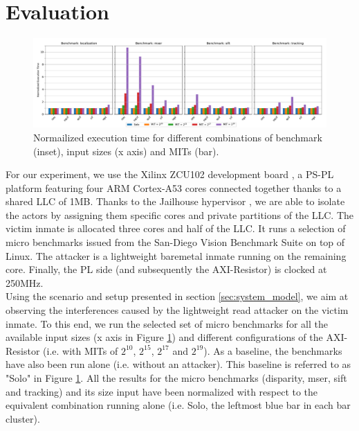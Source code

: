 \section{Evaluation}
    \label{sec:evaluation}
    \begin{figure}
        \centering
        \includegraphics[scale=0.425]{images/cpu-brainfreeze-interference.pdf}
        \caption{Normailized execution time for different combinations of benchmark (inset), input sizes (x axis) and MITs (bar).}
        \label{fig:cpu-brainfreeze-interference-results}
    \end{figure}

    For our experiment, we use the Xilinx ZCU102 development board \cite{Xilinx-ULTRASCALE-TRM}, a PS-PL platform featuring four ARM Cortex-A53 cores \cite{ARM-cortex-A53} connected together thanks to a shared LLC of 1MB.
    Thanks to the Jailhouse hypervisor \cite{jailhouse}, we are able to isolate the actors by assigning them specific cores and private partitions of the LLC.
    The victim inmate is allocated three cores and half of the LLC.
    It runs a selection of micro benchmarks issued from the San-Diego Vision Benchmark Suite \cite{SD-VBS} on top of Linux.
    The attacker is a lightweight baremetal inmate running on the remaining core.
    Finally, the PL side (and subsequently the AXI-Resistor) is clocked at 250MHz.\\

    Using the scenario and setup presented in section \ref{sec:system_model}, we aim at observing the interferences caused by the lightweight read attacker on the victim inmate.
    To this end, we run the selected set of micro benchmarks for all the available input sizes (x axis in Figure \ref{fig:cpu-brainfreeze-interference-results}) and different configurations of the AXI-Resistor (i.e. with MITs of $2^{10}$, $2^{15}$, $2^{17}$ and $2^{19}$).
    As a baseline, the benchmarks have also been run alone (i.e. without an attacker).
    This baseline is referred to as "Solo" in Figure \ref{fig:cpu-brainfreeze-interference-results}.
    All the results for the micro benchmarks (disparity, mser, sift and tracking) and its size input have been normalized with respect to the equivalent combination running alone (i.e. Solo, the leftmost blue bar in each bar cluster).

